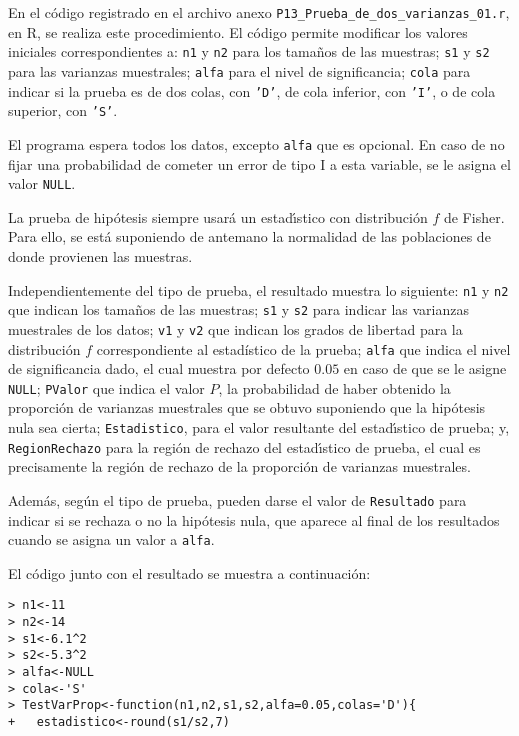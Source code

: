 \begin{solucion}
 En el c\'odigo registrado en el archivo anexo
 \texttt{P13\_Prueba\_de\_dos\_varianzas\_01.r}, en R,
 se realiza este procedimiento.
 El c\'odigo permite modificar los valores iniciales correspondientes a:
 \texttt{n1} y \texttt{n2} para los tama\~nos de las muestras;
 \texttt{s1} y \texttt{s2} para las varianzas muestrales;
 \texttt{alfa} para el nivel de significancia;
 \texttt{cola} para indicar si la prueba es de dos colas,
 con \texttt{'D'}, de cola inferior, con \texttt{'I'},
 o de cola superior, con \texttt{'S'}.
 \par 
 El programa espera todos los datos, excepto \texttt{alfa} que es opcional.
 En caso de no fijar una probabilidad de cometer un error de tipo I
 a esta variable, se le asigna el valor \texttt{NULL}.
 \par 
 La prueba de hip\'otesis siempre usar\'a un estad\'{\i}stico
 con distribuci\'on $f$ de Fisher.
 Para ello, se est\'a suponiendo de antemano la normalidad
 de las poblaciones de donde provienen las muestras.
 \par
 Independientemente del tipo de prueba, el resultado muestra lo siguiente:
 \texttt{n1} y \texttt{n2} que indican los tama\~nos de las muestras;
 \texttt{s1} y \texttt{s2} para indicar las varianzas muestrales de los datos;
 \texttt{v1} y \texttt{v2} que indican los grados de libertad
 para la distribuci\'on $f$ correspondiente al estadístico de la prueba;
 \texttt{alfa} que indica el nivel de significancia dado,
 el cual muestra por defecto $0.05$
 en caso de que se le asigne \texttt{NULL};
 \texttt{PValor} que indica el valor $P$, la probabilidad
 de haber obtenido la proporci\'on de varianzas muestrales que se obtuvo
 suponiendo que la hip\'otesis nula sea cierta;
 \texttt{Estadistico}, para el valor resultante
 del estad\'{\i}stico de prueba; y,
 \texttt{RegionRechazo} para la regi\'on de rechazo del estad\'{\i}stico
 de prueba, el cual es precisamente la regi\'on de rechazo de la proporci\'on
 de varianzas muestrales.
 \par 
 Adem\'as, seg\'un el tipo de prueba, pueden darse el valor
 de \texttt{Resultado} para indicar si se rechaza o no
 la hip\'otesis nula, que aparece al final de los resultados
 cuando se asigna un valor a \texttt{alfa}.
 \par 
 El c\'odigo junto con el resultado se muestra a continuaci\'on:
 \begin{verbatim}
> n1<-11
> n2<-14
> s1<-6.1^2
> s2<-5.3^2
> alfa<-NULL
> cola<-'S'
> TestVarProp<-function(n1,n2,s1,s2,alfa=0.05,colas='D'){
+   estadistico<-round(s1/s2,7)

\end{verbatim}
\end{solucion}
